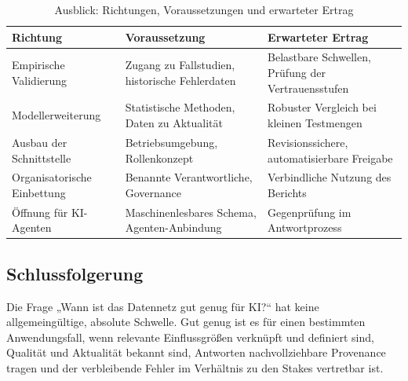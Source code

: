 \documentclass[a4paper,12pt]{article}
\theoremstyle{definition}
\begin{document}
\begin{table}[H]
\centering
\caption{Ausblick: Richtungen, Voraussetzungen und erwarteter Ertrag}\label{tab:roadmap}
\begin{tabular}{P{3.6cm}P{4.6cm}P{5.8cm}}
\toprule
Richtung & Voraussetzung & Erwarteter Ertrag \\
\midrule
Empirische Validierung & Zugang zu Fallstudien, historische Fehlerdaten & Belastbare Schwellen, Prüfung der Vertrauensstufen \\
Modellerweiterung & Statistische Methoden, Daten zu Aktualität & Robuster Vergleich bei kleinen Testmengen \\
Ausbau der Schnittstelle & Betriebsumgebung, Rollenkonzept & Revisionssichere, automatisierbare Freigabe \\
Organisatorische Einbettung & Benannte Verantwortliche, Governance & Verbindliche Nutzung des Berichts \\
Öffnung für KI-Agenten & Maschinenlesbares Schema, Agenten-Anbindung & Gegenprüfung im Antwortprozess \\
\bottomrule
\end{tabular}
\end{table}

\subsection{Schlussfolgerung}
Die Frage „Wann ist das Datennetz gut genug für KI?“ hat keine allgemeingültige, absolute Schwelle. Gut genug ist es für einen bestimmten Anwendungsfall, wenn relevante Einflussgrößen verknüpft und definiert sind, Qualität und Aktualität bekannt sind, Antworten nachvollziehbare Provenance tragen und der verbleibende Fehler im Verhältnis zu den Stakes vertretbar ist.
\end{document}
